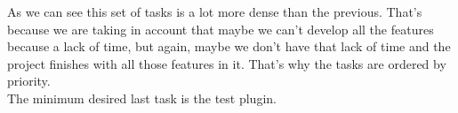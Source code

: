 \documentclass[a4paper,11pt]{scrartcl}
\begin{document}
As we can see this set of tasks is a lot more dense than the previous. That's
because we are taking in account that maybe we can't develop all the features
because a lack of time, but again, maybe we don't have that lack of time and 
the project finishes with all those features in it. That's why the tasks are 
ordered by priority.\\
The minimum desired last task is the test plugin.
\end{document}
